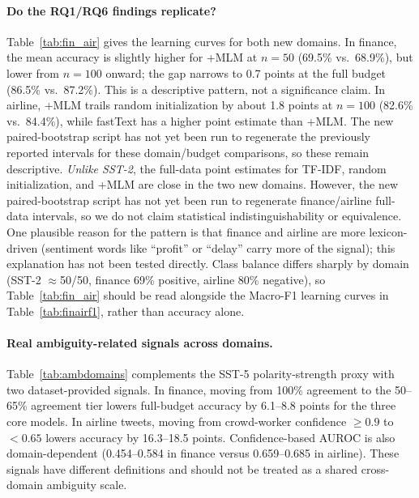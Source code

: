 \documentclass[11pt,a4paper]{article}
\begin{document}
\paragraph{Do the RQ1/RQ6 findings replicate?} Table~\ref{tab:fin_air} gives the learning curves for both new domains. In finance, the mean accuracy is slightly higher for +MLM at $n{=}50$ (69.5\% vs.\ 68.9\%), but lower from $n{=}100$ onward; the gap narrows to 0.7 points at the full budget (86.5\% vs.\ 87.2\%). This is a descriptive pattern, not a significance claim. In airline, +MLM trails random initialization by about 1.8 points at $n{=}100$ (82.6\% vs.\ 84.4\%), while fastText has a higher point estimate than +MLM. The new paired-bootstrap script has not yet been run to regenerate the previously reported intervals for these domain/budget comparisons, so these remain descriptive.
\emph{Unlike SST-2}, the full-data point estimates for TF-IDF, random initialization, and +MLM are close in the two new domains. However, the new paired-bootstrap script has not yet been run to regenerate finance/airline full-data intervals, so we do not claim statistical indistinguishability or equivalence. One plausible reason for the pattern is that finance and airline are more lexicon-driven (sentiment words like ``profit'' or ``delay'' carry more of the signal); this explanation has not been tested directly.
Class balance differs sharply by domain (SST-2 $\approx$50/50, finance 69\% positive, airline 80\% negative), so Table~\ref{tab:fin_air} should be read alongside the Macro-F1 learning curves in Table~\ref{tab:finairf1}, rather than accuracy alone.







\paragraph{Real ambiguity-related signals across domains.} Table~\ref{tab:ambdomains} complements the SST-5 polarity-strength proxy with two dataset-provided signals. In finance, moving from 100\% agreement to the 50--65\% agreement tier lowers full-budget accuracy by 6.1--8.8 points for the three core models. In airline tweets, moving from crowd-worker confidence $\geq0.9$ to $<0.65$ lowers accuracy by 16.3--18.5 points. Confidence-based AUROC is also domain-dependent (0.454--0.584 in finance versus 0.659--0.685 in airline). These signals have different definitions and should not be treated as a shared cross-domain ambiguity scale.
\end{document}

